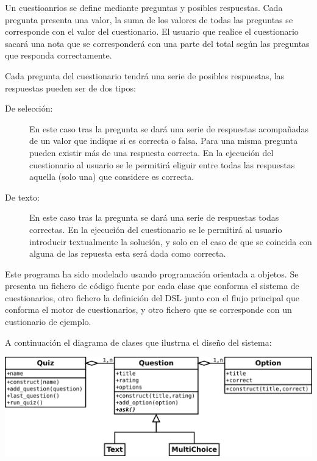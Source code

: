 Un cuestioanrios se define mediante preguntas y posibles respuestas. Cada pregunta presenta una valor, la suma de los valores de todas las preguntas 
se corresponde con el valor del cuestionario. El usuario que realice el cuestionario sacará una nota que se corresponderá con una parte del total según las preguntas
que responda correctamente. 

Cada pregunta del cuestionario tendrá una serie de posibles respuestas, las respuestas pueden ser de dos tipos:

\begin{description}
\item [De selección:] En este caso tras la pregunta se dará una serie de respuestas acompañadas de un valor que indique si es correcta o falsa. Para una misma pregunta pueden
existir más de una respuesta correcta. En la ejecución del cuestionario al usuario se le permitirá eliguir entre todas las respuestas aquella (solo una) que considere es correcta.
\item [De texto:] En este caso tras la pregunta se dará una serie de respuestas todas correctas. En la ejecución del cuestionario se le permitirá al usuario introducir textualmente
la solución, y solo en el caso de que se coincida con alguna de las repuesta esta será dada como correcta.
\end{description}

Este programa ha sido modelado usando programación orientada a objetos. Se presenta un fichero de código fuente por cada clase que conforma el sistema de cuestionarios, otro fichero 
la definición del DSL junto con el flujo principal que conforma el motor de cuestionarios, y otro fichero que se corresponde con un custionario de ejemplo.

A continuación el diagrama de clases que ilustrna el diseño del sistema:

\begin{center}
\includegraphics[scale=0.4]{sdl.png} \\
\end{center}

